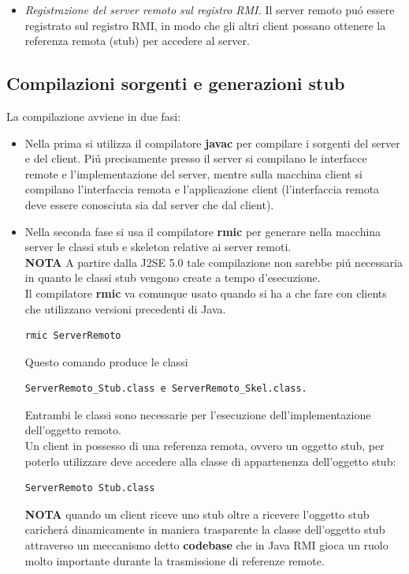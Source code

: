 \documentclass[a4paper, 12 pt, italian]{report}
\begin{document}
\begin{itemize}
\item \textit{Registrazione del server remoto sul registro RMI.} Il server remoto pu\'o essere registrato sul registro RMI, in modo che gli altri client possano ottenere la referenza remota (stub) per accedere al server.

\end{itemize}

\newpage

\subsection{Compilazioni sorgenti e generazioni stub}
La compilazione avviene in due fasi:

\begin{itemize}

\item Nella prima si utilizza il compilatore \textbf{javac} per compilare i sorgenti del server e del client. Pi\'u precisamente presso il server si compilano le interfacce remote e l'implementazione del server, mentre sulla macchina client si compilano l'interfaccia remota e l'applicazione client (l'interfaccia remota deve essere conosciuta sia dal server che dal client).\\

\item Nella seconda fase si usa il compilatore \textbf{rmic} per generare nella macchina server le classi stub e skeleton relative ai server remoti. 
\\
\textbf{NOTA} A partire dalla J2SE 5.0 tale compilazione non sarebbe pi\'u necessaria in quanto le classi stub vengono create a tempo d'esecuzione. \\
Il compilatore \textbf{rmic} va comunque usato quando si ha a che fare con clients che utilizzano versioni precedenti di Java.
\begin{verbatim}
rmic ServerRemoto
\end{verbatim}
Questo comando produce le classi
\begin{verbatim}
ServerRemoto_Stub.class e ServerRemoto_Skel.class. 
\end{verbatim}
Entrambi le classi sono necessarie per l'esecuzione dell'implementazione dell'oggetto remoto.\\
Un client in possesso di una referenza remota, ovvero un oggetto stub, per poterlo utilizzare deve accedere alla classe di appartenenza dell'oggetto stub:
\begin{verbatim}
ServerRemoto Stub.class
\end{verbatim}

\textbf{NOTA} quando un client riceve uno stub oltre a ricevere l'oggetto stub caricher\'a dinamicamente in maniera trasparente la classe dell'oggetto stub attraverso un meccanismo detto \textbf{codebase} che in Java RMI gioca un ruolo molto importante durante la trasmissione di referenze remote.

\end{itemize}
\end{document}
